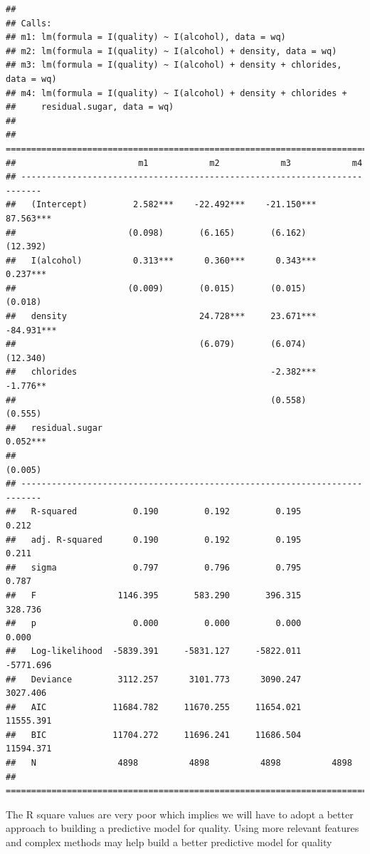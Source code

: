 \documentclass[]{article}
\begin{document}
\begin{verbatim}
## 
## Calls:
## m1: lm(formula = I(quality) ~ I(alcohol), data = wq)
## m2: lm(formula = I(quality) ~ I(alcohol) + density, data = wq)
## m3: lm(formula = I(quality) ~ I(alcohol) + density + chlorides, data = wq)
## m4: lm(formula = I(quality) ~ I(alcohol) + density + chlorides + 
##     residual.sugar, data = wq)
## 
## ==========================================================================
##                        m1            m2            m3            m4       
## --------------------------------------------------------------------------
##   (Intercept)         2.582***    -22.492***    -21.150***     87.563***  
##                      (0.098)       (6.165)       (6.162)      (12.392)    
##   I(alcohol)          0.313***      0.360***      0.343***      0.237***  
##                      (0.009)       (0.015)       (0.015)       (0.018)    
##   density                          24.728***     23.671***    -84.931***  
##                                    (6.079)       (6.074)      (12.340)    
##   chlorides                                      -2.382***     -1.776**   
##                                                  (0.558)       (0.555)    
##   residual.sugar                                                0.052***  
##                                                                (0.005)    
## --------------------------------------------------------------------------
##   R-squared           0.190         0.192         0.195         0.212     
##   adj. R-squared      0.190         0.192         0.195         0.211     
##   sigma               0.797         0.796         0.795         0.787     
##   F                1146.395       583.290       396.315       328.736     
##   p                   0.000         0.000         0.000         0.000     
##   Log-likelihood  -5839.391     -5831.127     -5822.011     -5771.696     
##   Deviance         3112.257      3101.773      3090.247      3027.406     
##   AIC             11684.782     11670.255     11654.021     11555.391     
##   BIC             11704.272     11696.241     11686.504     11594.371     
##   N                4898          4898          4898          4898         
## ==========================================================================
\end{verbatim}

The R square values are very poor which implies we will have to adopt a
better approach to building a predictive model for quality. Using more
relevant features and complex methods may help build a better predictive
model for quality
\end{document}
